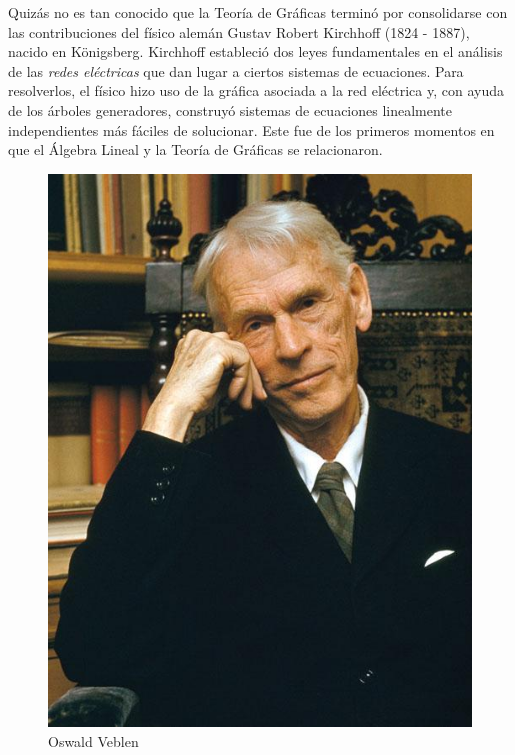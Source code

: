 Quizás no es tan conocido que la Teoría de Gráficas terminó por consolidarse con las contribuciones del físico alemán Gustav Robert  Kirchhoff (1824 - 1887), nacido en Königsberg. Kirchhoff estableció dos leyes fundamentales en el análisis de las \textit{redes eléctricas} que dan lugar a ciertos sistemas de ecuaciones. Para resolverlos, el físico hizo uso de la gráfica asociada a la red eléctrica y, con ayuda de los árboles generadores, construyó sistemas de ecuaciones linealmente independientes más fáciles de solucionar. Este fue de los primeros momentos en que el Álgebra Lineal y la Teoría de Gráficas se relacionaron.

\begin{figure}
    \centering
    \includegraphics[scale=0.4]{img/imgintro/veblen.jpg}
    \caption{Oswald Veblen}
    \label{fig:veblen}
    \vspace{-0.5cm}
\end{figure}

